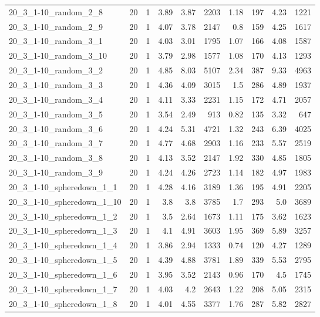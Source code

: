 \begin{center}
\begin{scriptsize}
\begin{longtable}{lrrrrrrrrr}
20\_3\_1-10\_random\_2\_8 & 20 & 1 & 3.89 & 3.87 & 2203 & 1.18 & 197 & 4.23 & 1221\\
20\_3\_1-10\_random\_2\_9 & 20 & 1 & 4.07 & 3.78 & 2147 & 0.8 & 159 & 4.25 & 1617\\
20\_3\_1-10\_random\_3\_1 & 20 & 1 & 4.03 & 3.01 & 1795 & 1.07 & 166 & 4.08 & 1587\\
20\_3\_1-10\_random\_3\_10 & 20 & 1 & 3.79 & 2.98 & 1577 & 1.08 & 170 & 4.13 & 1293\\
20\_3\_1-10\_random\_3\_2 & 20 & 1 & 4.85 & 8.03 & 5107 & 2.34 & 387 & 9.33 & 4963\\
20\_3\_1-10\_random\_3\_3 & 20 & 1 & 4.36 & 4.09 & 3015 & 1.5 & 286 & 4.89 & 1937\\
20\_3\_1-10\_random\_3\_4 & 20 & 1 & 4.11 & 3.33 & 2231 & 1.15 & 172 & 4.71 & 2057\\
20\_3\_1-10\_random\_3\_5 & 20 & 1 & 3.54 & 2.49 & 913 & 0.82 & 135 & 3.32 & 647\\
20\_3\_1-10\_random\_3\_6 & 20 & 1 & 4.24 & 5.31 & 4721 & 1.32 & 243 & 6.39 & 4025\\
20\_3\_1-10\_random\_3\_7 & 20 & 1 & 4.77 & 4.68 & 2903 & 1.16 & 233 & 5.57 & 2519\\
20\_3\_1-10\_random\_3\_8 & 20 & 1 & 4.13 & 3.52 & 2147 & 1.92 & 330 & 4.85 & 1805\\
20\_3\_1-10\_random\_3\_9 & 20 & 1 & 4.24 & 4.26 & 2723 & 1.14 & 182 & 4.97 & 1983\\
20\_3\_1-10\_spheredown\_1\_1 & 20 & 1 & 4.28 & 4.16 & 3189 & 1.36 & 195 & 4.91 & 2205\\
20\_3\_1-10\_spheredown\_1\_10 & 20 & 1 & 3.8 & 3.8 & 3785 & 1.7 & 293 & 5.0 & 3689\\
20\_3\_1-10\_spheredown\_1\_2 & 20 & 1 & 3.5 & 2.64 & 1673 & 1.11 & 175 & 3.62 & 1623\\
20\_3\_1-10\_spheredown\_1\_3 & 20 & 1 & 4.1 & 4.91 & 3603 & 1.95 & 369 & 5.89 & 3257\\
20\_3\_1-10\_spheredown\_1\_4 & 20 & 1 & 3.86 & 2.94 & 1333 & 0.74 & 120 & 4.27 & 1289\\
20\_3\_1-10\_spheredown\_1\_5 & 20 & 1 & 4.39 & 4.88 & 3781 & 1.89 & 339 & 5.53 & 2795\\
20\_3\_1-10\_spheredown\_1\_6 & 20 & 1 & 3.95 & 3.52 & 2143 & 0.96 & 170 & 4.5 & 1745\\
20\_3\_1-10\_spheredown\_1\_7 & 20 & 1 & 4.03 & 4.2 & 2643 & 1.22 & 208 & 5.05 & 2315\\
20\_3\_1-10\_spheredown\_1\_8 & 20 & 1 & 4.01 & 4.55 & 3377 & 1.76 & 287 & 5.82 & 2827\\

\end{longtable}
\end{scriptsize}
\end{center}
